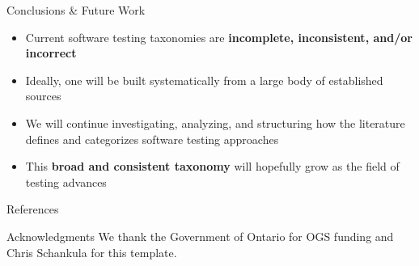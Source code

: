 \documentclass[22pt]{beamer}
\begin{document}
\begin{frame}[fragile]
\begin{textblock}{7.25}
        \begin{block}{\fontsize{37}{20}\selectfont Conclusions \& Future Work}
            \begin{itemize}
                \item Current software testing taxonomies are \textbf{incomplete,
                          inconsistent, and/or incorrect}
                \item Ideally, one will be built systematically
                      from a large body of established sources
                \item We will continue investigating, analyzing, and structuring
                      how the literature defines
                      and categorizes software testing approaches
                \item This \textbf{broad and consistent taxonomy} will hopefully
                      grow as the field of testing advances
            \end{itemize}
            \vspace{5mm}
        \end{block}

        \begin{block}{\fontsize{37}{20}\selectfont References}
            
            {\fontsize{26}{12}\selectfont
                }
            \vspace{5mm}
        \end{block}

        \begin{block}{\fontsize{37}{20}\selectfont Acknowledgments}
            We thank the Government of Ontario for OGS funding and Chris
            Schankula for this template.
            \vspace{5mm}
        \end{block}
    \end{textblock}

\end{frame}
\end{document}
